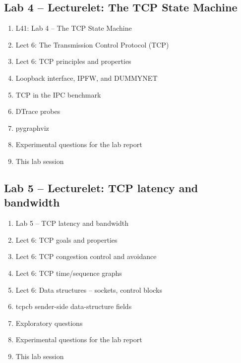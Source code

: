 \documentclass[a4paper,10pt]{article}
\begin{document}
\subsection*{Lab 4 -- Lecturelet: The TCP State Machine}

\begin{enumerate}
  \item L41: Lab 4 -- The TCP State Machine
  \item Lect 6: The Transmission Control Protocol (TCP)
  \item Lect 6: TCP principles and properties
  \item Loopback interface, IPFW, and DUMMYNET
  \item TCP in the IPC benchmark
  \item DTrace probes
  \item pygraphviz
  \item Experimental questions for the lab report
  \item This lab session
\end{enumerate}

\subsection*{Lab 5 -- Lecturelet: TCP latency and bandwidth}

\begin{enumerate}
  \item Lab 5 -- TCP latency and bandwidth
  \item Lect 6: TCP goals and properties
  \item Lect 6: TCP congestion control and avoidance
  \item Lect 6: TCP time/sequence graphs
  \item Lect 6: Data structures -- sockets, control blocks
  \item tcpcb sender-side data-structure fields
  \item Exploratory questions
  \item Experimental questions for the lab report
  \item This lab session
\end{enumerate}
\end{document}
